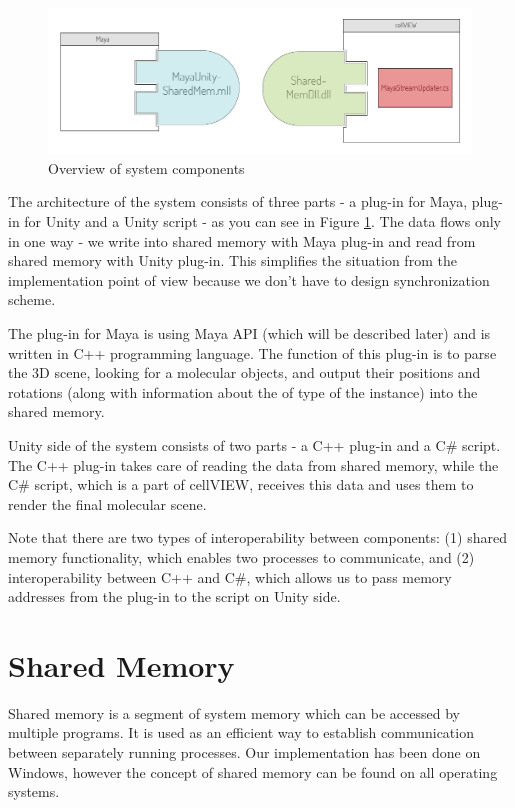 \documentclass[
  digital, %
  table,   %
  nolof,     %
  nolot,     %
]{fithesis3}
\begin{document}
\begin{figure}
  \begin{center}
    \includegraphics[scale=0.8]{images/system-architecture-overview.pdf}
  \end{center}
  \caption{Overview of system components}
  \label{fig:system-overview}
\end{figure}

The architecture of the system consists of three parts - a plug-in for Maya, plug-in for Unity and a Unity script - as you can see in Figure \ref{fig:system-overview}.
The data flows only in one way - we write into shared memory with Maya plug-in and read from shared memory with Unity plug-in. This simplifies the situation from the implementation point of view because we don't have to design synchronization scheme.

The plug-in for Maya is using Maya API (which will be described later) and is written in C++ programming language. The function of this plug-in is to parse the 3D scene, looking for a molecular objects, and output their positions and rotations (along with information about the of type of the instance) into the shared memory.

Unity side of the system consists of two parts - a C++ plug-in and a C\# script. The C++ plug-in takes care of reading the data from shared memory, while the C\# script, which is a part of cellVIEW, receives this data and uses them to render the final molecular scene.

Note that there are two types of interoperability between components: (1) shared memory functionality, which enables two processes to communicate, and (2) interoperability between C++ and C\#, which allows us to pass memory addresses from the plug-in to the script on Unity side.

\section{Shared Memory}
Shared memory is a segment of system memory which can be accessed by multiple programs. It is used as an efficient way to establish communication between separately running processes. Our implementation has been done on Windows, however the concept of shared memory can be found on all operating systems.
\end{document}

